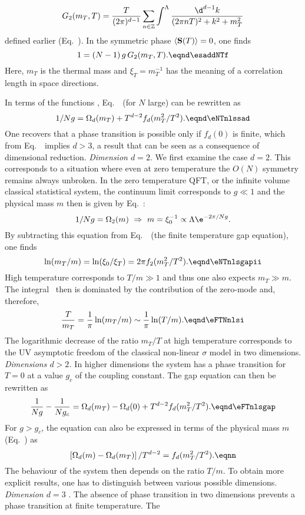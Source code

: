 $$ G_2(m_T, T)  ={T\over (2\pi)^{d-1}  }\sum_{n\in{\Bbb Z}}\int^\Lambda {\d^{d-1} k\over (2\pi n T )^2+k^2+m_T^2}  $$
defined earlier (Eq.~\eNfivTtp). In the symmetric phase $ \left<{\bf S}(T)\right>=0$, one finds
$$1= (N-1)\, g \, G_2(m_T,T)
. \eqnd\esaddNTf $$
Here, $m_T$ is the thermal mass and $\xi_T=m_T^{-1}$ has the meaning of a correlation length in  space
directions.  \par
In terms of the functions  \eqns{\etadepole, \eThermfz},
 Eq.~\esaddNTf\ (for $N$ large)  can be rewritten as
$${1 / Ng}=  \Omega_d(m_T ) +T^{d-2} f_d (m_T^2/T^2 ).  \eqnd\eNTnlssad $$
One recovers that a phase transition is possible only if $f_d(0)$ is finite,
which from Eq.~\eTfzzero\ implies $d>3$, a result that can be seen as a consequence of   dimensional reduction.
\medskip
{\it Dimension $d=2$}. We first examine the case $d=2$.
This corresponds to a situation where even at zero temperature  the
$O(N)$ symmetry remains always unbroken. In
the zero temperature QFT, or the infinite volume classical statistical
system, the continuum limit corresponds to $g\ll 1$ and the physical
mass $m$ then is given by  Eq.~\eNsigmii:
$$ 1/ Ng = \Omega _2(m) \ \Rightarrow \
m =\xi_0^{-1}\propto \Lambda \e^{-2\pi/N g}.$$
By subtracting this equation from Eq.~\eNTnlssad\ (the  finite
temperature gap equation), one finds
$$\ln(m_T/m )=\ln(\xi_0/\xi_T)=2\pi f_2 (m_T^2/T^2 ). \eqnd\eNTnlsgapii $$
High temperature corresponds to $ T/m   \gg 1 $ and thus one also
expects $ m_T \gg m  $. The integral \eThermfz\ then is dominated by
the contribution of the zero-mode and, therefore,
$${T\over m_T}  ={1\over \pi} \ln (m_T/m  )\sim  {1\over
\pi} \ln(T/m  ).\eqnd\eFTNnlsi $$
The logarithmic decrease of the ratio $m_T/T$ at high temperature  corresponds to the UV asymptotic freedom of the classical non-linear $\sigma
$ model in two dimensions.
\medskip
{\it Dimensions $d>2$.} In higher dimensions the system has a phase
transition for $T=0$ at a value $g_c$ of the coupling constant. The gap equation can then be rewritten as
 $${1\over Ng}-{1\over Ng_c}=\Omega_d(m_T )-\Omega_d(0)
+T^{d-2}f_d (m_T^2/ T^2 ).\eqnd\eFTnlsgap  $$
For $g>g_c$, the equation can also be expressed in terms of  the physical mass $m$ (Eq.~\emasNsig) as
$$\left[\Omega_d(m )-\Omega_d(m_T )\right]/T^{d-2}=f_d (m_T^2/
T^2 ).\eqnn $$
The behaviour of the system then depends
on the ratio $T/m $.
To obtain more explicit results, one has to distinguish between various possible dimensions.
\medskip
{\it Dimension $d=3$} . The absence of phase transition in two dimensions prevents a phase transition at finite temperature. The
